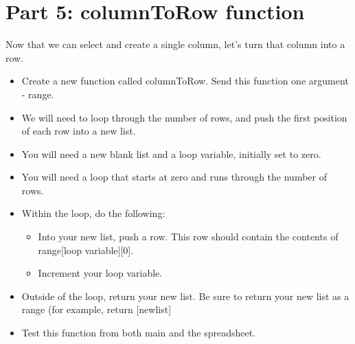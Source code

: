 \documentclass{article}
\begin{document}
\section*{Part 5: columnToRow function}
Now that we can select and create a single column, let's turn that column into a row.
\begin{itemize}
    \item Create a new function called columnToRow.  Send this function one argument - range.
    \item We will need to loop through the number of rows, and push the first position of each row into a new list.
    \item You will need a new blank list and a loop variable, initially set to zero.
    \item You will need a loop that starts at zero and runs through the number of rows.
    \item Within the loop, do the following:
    \begin{itemize}
    		\item Into your new list, push a row.  This row should contain the contents of range[loop variable][0].
    		\item Increment your loop variable.
    	\end{itemize}
    	\item Outside of the loop, return your new list.  Be sure to return your new list as a range (for example, return [newlist]
    	\item Test this function from both main and the spreadsheet.
\end{itemize}
\end{document}
